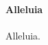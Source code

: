 \documentclass[11pt, ngermanm, titlepage]{article}
\begin{document}
\begin{multicols}{2}
	\paragraph{Alleluia\newline}
	Alleluia.
		
	\end{multicols}
\end{document}
